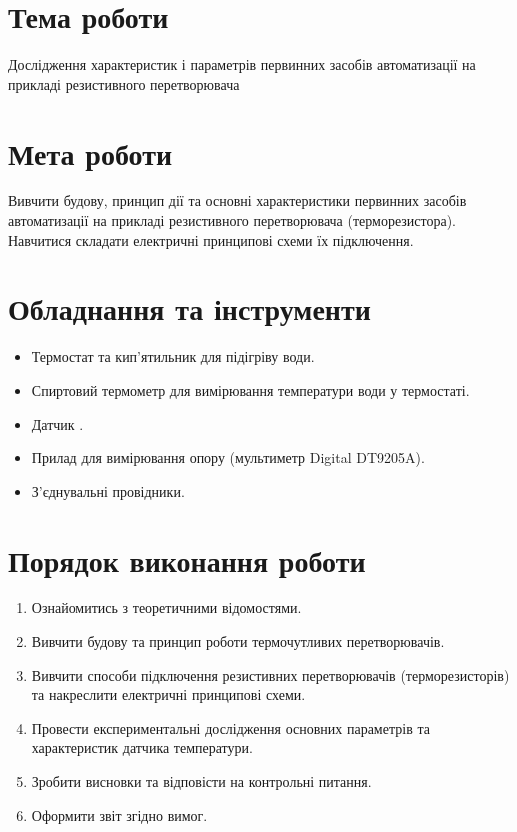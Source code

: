 \documentclass[a4paper]{article}
\begin{document}

\section*{Тема роботи}
Дослідження характеристик і параметрів
        первинних засобів автоматизації на 
        прикладі резистивного перетворювача
        
\section*{Мета роботи}
Вивчити будову, принцип дії та основні характеристики первинних засобів автоматизації на прикладі резистивного перетворювача (терморезистора). Навчитися складати електричні принципові схеми їх підключення.

\section*{Обладнання та інструменти}
\begin{itemize}
    \item Термостат та кип'ятильник для підігріву води.
    \item Спиртовий термометр для вимірювання температури води у термостаті.
    \item Датчик .
    \item Прилад для вимірювання опору (мультиметр Digital DT9205A).
    \item З’єднувальні провідники.
\end{itemize}

\section*{Порядок виконання роботи}
\begin{enumerate}
    \item Ознайомитись з теоретичними відомостями.
    \item Вивчити будову та принцип роботи термочутливих перетворювачів.
    \item Вивчити способи підключення резистивних перетворювачів (терморезисторів) та накреслити електричні принципові схеми.
    \item Провести експериментальні дослідження основних параметрів та характеристик датчика температури.
    \item Зробити висновки та відповісти на контрольні питання.
    \item Оформити звіт згідно вимог.
\end{enumerate}
\end{document}
